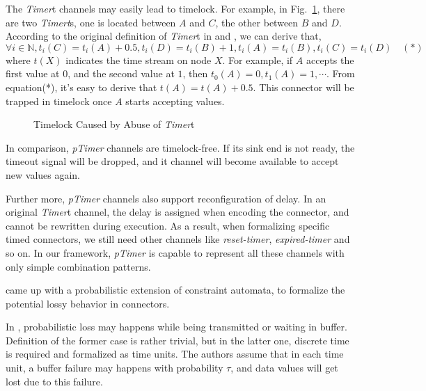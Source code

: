 \begin{example}
    The \emph{Timer}t channels may easily lead to timelock. For example, in Fig.~\ref{fig:timelock}, there are two \emph{Timert}s, one is located between $A$ and $C$, the other between $B$ and $D$. According to the original definition of \emph{Timer}t in \cite{Arbab2006} and \cite{Meng2012}, we can derive that,
    \[
        \forall i\in\mathbb{N}, t_i(C)=t_i(A)+0.5, t_i(D)=t_i(B)+1,t_i(A)=t_i(B), t_i(C)=t_i(D)\quad (*)
    \]
    where $t(X)$ indicates the time stream on node $X$. For example, if $A$ accepts the first value at $0$, and the second value at $1$, then $t_0(A)=0,t_1(A)=1,\cdots$. From equation(*), it's easy to derive that $t(A) = t(A) + 0.5$. This connector will be trapped in timelock once $A$ starts accepting values.
    \begin{figure}[H]
        \centering
        
        \label{fig:timelock}
        \caption{Timelock Caused by Abuse of \emph{Timer}t}
    \end{figure}
\end{example}

In comparison, \emph{pTimer} channels are timelock-free. If its sink end is not ready, the timeout signal will be dropped, and it channel will become available to accept new values again.

Further more, \emph{pTimer} channels also support reconfiguration of delay. In an original \emph{Timer}t channel, the delay is assigned when encoding the connector, and cannot be rewritten during execution. As a result, when formalizing specific timed connectors, we still need other channels like \emph{reset-timer}, \emph{expired-timer} and so on. In our framework, \emph{pTimer} is capable to represent all these channels with only simple combination patterns.

\vspace{0.5em}
 \cite{Models2005} came up with a probabilistic extension of constraint automata, to formalize the potential lossy behavior in connectors.

In \cite{Models2005}, probabilistic loss may happens while being transmitted or waiting in buffer. Definition of the former case is rather trivial, but in the latter one, discrete time is required and formalized as time units. The authors assume that in each time unit, a buffer failure may happens with probability $\tau$, and data values will get lost due to this failure.

